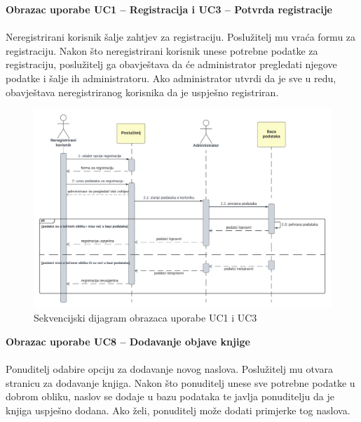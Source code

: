 				\textbf{Obrazac uporabe UC1 – Registracija i UC3 – Potvrda registracije}\\\\
				Neregistrirani korisnik šalje zahtjev za registraciju. Poslužitelj mu vraća formu za registraciju. Nakon što neregistrirani korisnik unese potrebne podatke za registraciju, poslužitelj ga obavještava da će administrator pregledati njegove podatke i šalje ih administratoru. Ako administrator utvrdi da je sve u redu, obavještava neregistriranog korisnika da je uspješno registriran.\\
				
				\begin{figure}[h]
					\centering
					\includegraphics[width = \textwidth]{slike/sekvUC1UC3.PNG}
					\caption{Sekvencijski dijagram obrazaca uporabe UC1 i UC3}
					\label{fig:enter-label}
				\end{figure}
				\eject
				
				\textbf{Obrazac uporabe UC8 – Dodavanje objave knjige}\\\\
				Ponuditelj odabire opciju za dodavanje novog naslova. Poslužitelj mu otvara stranicu za dodavanje knjiga. Nakon što ponuditelj unese sve potrebne podatke u dobrom obliku, naslov se dodaje u bazu podataka te javlja ponuditelju da je knjiga uspješno dodana. Ako želi, ponuditelj može dodati primjerke tog naslova.\\
				
